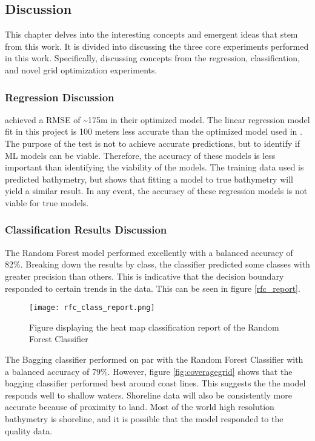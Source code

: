 \subsection{Discussion}
\setlength{\parindent}{10ex}
This chapter delves into the interesting concepts and emergent ideas that stem from this work.
It is divided into discussing the three core experiments performed in this work.
Specifically, discussing concepts from the regression, classification, and novel grid optimization experiments.

\subsubsection{Regression Discussion}
\cite{jena2012prediction} achieved a \ac{RMSE} of \~{}175m in their optimized model.
The linear regression model fit in this project is 100 meters less accurate than the optimized model used in \cite{jena2012prediction}.
The purpose of the test is not to achieve accurate predictions, but to identify if \ac{ML} models can be viable.
Therefore, the accuracy of these models is less important than identifying the viability of the models.
The training data used is predicted bathymetry, but shows that fitting a model to true bathymetry will yield a similar result.
In any event, the accuracy of these regression models is not viable for true models.

\subsubsection{Classification Results Discussion}
The Random Forest model performed excellently with a balanced accuracy of 82\%.
Breaking down the results by class, the classifier predicted some classes with greater precision than others.
This is indicative that the decision boundary responded to certain trends in the data.
This can be seen in figure \ref{rfc_report}.

\begin{figure}[h]
    \centering
    \texttt{[image: rfc\_class\_report.png]}
    \caption{Figure displaying the heat map classification report of the Random Forest Classifier}
    \label{fig:rfc_report}
\end{figure}

\par
The Bagging classifier performed on par with the Random Forest Classifier with a balanced accuracy of 79\%.
However, figure \ref{fig:coveragegrid} shows that the bagging classifier performed best around coast lines.
This suggests the the model responds well to shallow waters.
Shoreline data will also be consistently more accurate because of proximity to land.
Most of the world high resolution bathymetry is shoreline, and it is possible that the model responded to the quality data.


